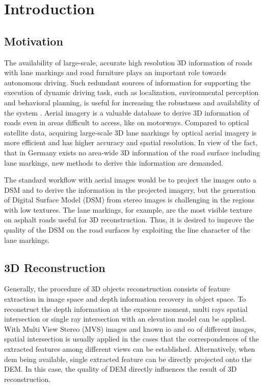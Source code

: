 
\chapter{Introduction}

\section{Motivation}
The availability of large-scale, accurate high resolution 3D information of roads with lane markings and road furniture plays an important role towards autonomous driving. Such redundant sources of information for supporting the execution of dynamic driving task, such as localization, environmental perception and behavioral planning, is useful for increasing the robustness and availability of the system \cite{Fischer2017}.
Aerial imagery is a valuable database to derive 3D information of roads even in areas difficult to access, like on motorways. Compared to optical satellite data, acquiring large-scale 3D lane markings by optical aerial imagery is more efficient and has higher accuracy and spatial resolution. In view of the fact, that in Germany exists no area-wide 3D information of the road surface including lane markings, new methods to derive this information are demanded.

The standard workflow with aerial images would be to project the images onto a DSM and to derive the information in the projected imagery, but the generation of Digital Surface Model (DSM) from stereo images is challenging in the regions with low textures. The lane markings, for example, are the most visible texture on asphalt roads useful for 3D reconstruction. Thus, it is desired to improve the quality of the DSM on the road surfaces by exploiting the line character of the lane markings. 




\section{3D Reconstruction}

Generally, the procedure of 3D objects reconstruction consists of feature extraction in image space and depth information recovery in object space. 
To reconstruct the depth information at the exposure moment, multi rays spatial intersection or single ray intersection with an elevation model can be applied.
With Multi View Stereo (MVS) images and known \gls{io} and \gls{eo} of different images, spatial intersection is usually applied in the cases that the correspondences of the extracted features among different views can be established.
Alternatively, when \gls{dem} being available, single extracted feature can be directly projected onto the DEM. In this case, the quality of DEM directly influences the result of 3D reconstruction. 

